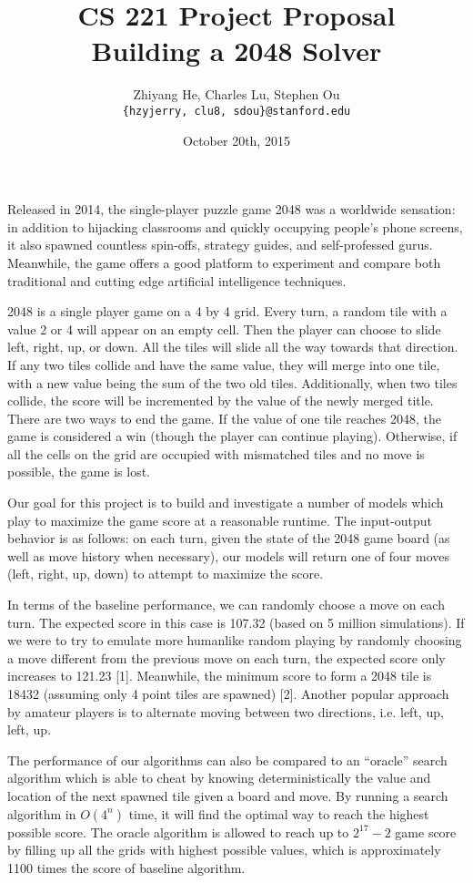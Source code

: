\documentclass[11pt]{article}
\title{CS 221 Project Proposal \\ Building a 2048 Solver}
\author{Zhiyang He, Charles Lu, Stephen Ou \\ \texttt{\{hzyjerry, clu8, sdou\}@stanford.edu}}
\date{October 20th, 2015}
\begin{document}
\maketitle

Released in 2014, the single-player puzzle game 2048 was a worldwide sensation: in addition to hijacking classrooms and quickly occupying people’s phone screens, it also spawned countless spin-offs, strategy guides, and self-professed gurus. Meanwhile, the game offers a good platform to experiment and compare both traditional and cutting edge artificial intelligence techniques.

2048 is a single player game on a 4 by 4 grid. Every turn, a random tile with a value 2 or 4 will appear on an empty cell. Then the player can choose to slide left, right, up, or down. All the tiles will slide all the way towards that direction. If any two tiles collide and have the same value, they will merge into one tile, with a new value being the sum of the two old tiles. Additionally, when two tiles collide, the score will be incremented by the value of the newly merged title. There are two ways to end the game. If the value of one tile reaches 2048, the game is considered a win (though the player can continue playing). Otherwise, if all the cells on the grid are occupied with mismatched tiles and no move is possible, the game is lost.

Our goal for this project is to build and investigate a number of models which play to maximize the game score at a reasonable runtime. The input-output behavior is as follows: on each turn, given the state of the 2048 game board (as well as move history when necessary), our models will return one of four moves (left, right, up, down) to attempt to maximize the score.

In terms of the baseline performance, we can randomly choose a move on each turn. The expected score in this case is 107.32 (based on 5 million simulations). If we were to try to emulate more humanlike random playing by randomly choosing a move different from the previous move on each turn, the expected score only increases to 121.23 [1]. Meanwhile, the minimum score to form a 2048 tile is 18432 (assuming only 4 point tiles are spawned) [2]. Another popular approach by amateur players is to alternate moving between two directions, i.e. left, up, left, up.

The performance of our algorithms can also be compared to an “oracle” search algorithm which is able to cheat by knowing deterministically the value and location of the next spawned tile given a board and move. By running a search algorithm in $O(4^n)$ time, it will find the optimal way to reach the highest possible score. The oracle algorithm is allowed to reach up to $2^{17} - 2$ game score by filling up all the grids with highest possible values, which is approximately 1100 times the score of baseline algorithm.
\end{document}
